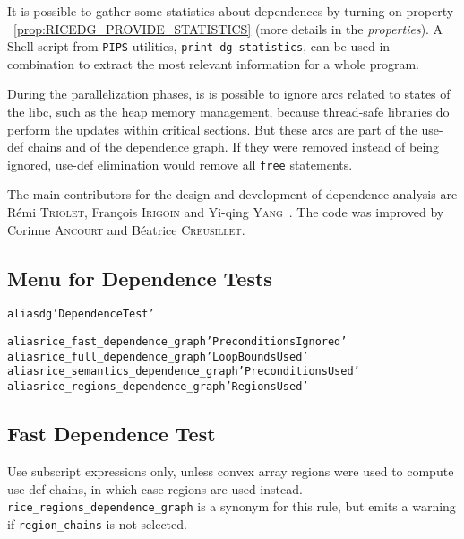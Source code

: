 \documentclass[a4paper]{report}
\newenvironment{PipsMake}{\begin{alltt}}{\end{alltt}}
\newcommand{\PipsPropRef}[1]{\texttt{\detokenize{#1}}~\ref{prop:#1}}
\newenvironment{PipsPass}[1]{\label{pass:#1}}{}
\newcommand{\Pips}{\texttt{PIPS}}
\newcommand{\PROPERTIES}{{\em properties}}
\begin{document}
\begin{PipsPass}{dg}
It is possible to gather some statistics about dependences by turning
on property \PipsPropRef{RICEDG_PROVIDE_STATISTICS} (more details in the
\PROPERTIES{}). A Shell script from \Pips{} utilities,
\verb/print-dg-statistics/, can be used in combination to extract the
most relevant information for a whole program.

During the parallelization phases, is is possible to ignore arcs
related to states of the libc, such as the heap memory management,
because thread-safe libraries do perform the updates within critical
sections. But these arcs are part of the use-def chains and of the
dependence graph. If they were removed instead of being ignored,
use-def elimination would remove all \verb/free/ statements.

The main contributors for the design and development of dependence
analysis are R\'emi \textsc{Triolet}, Fran\c{c}ois \textsc{Irigoin} and Yi-qing
\textsc{Yang}~\cite{Yan93}. The code was improved by Corinne
\textsc{Ancourt} and B\'eatrice \textsc{Creusillet}.
\end{PipsPass}

\subsection{Menu for Dependence Tests}
\label{subsubsection-menu-for-dependence-tests}

\begin{PipsMake}
alias dg 'Dependence Test'

alias rice_fast_dependence_graph 'Preconditions Ignored'
alias rice_full_dependence_graph 'Loop Bounds Used'
alias rice_semantics_dependence_graph 'Preconditions Used'
alias rice_regions_dependence_graph 'Regions Used'
\end{PipsMake}

\subsection{Fast Dependence Test}
\label{subsubsection-fast-dependence-test}

\begin{PipsPass}{rice_fast_dependence_graph}
Use subscript expressions only, unless convex array regions were used to compute
use-def chains, in which case regions are used instead. {\tt
  rice\_regions\_dependence\_graph} is a synonym for this rule, but emits a
warning if {\tt region\_chains} is not selected.
\end{PipsPass}
\end{document}
